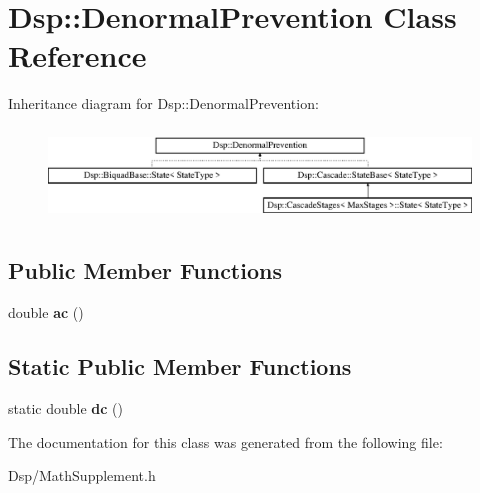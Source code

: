 \hypertarget{classDsp_1_1DenormalPrevention}{\section{Dsp\-:\-:Denormal\-Prevention Class Reference}
\label{classDsp_1_1DenormalPrevention}
}
Inheritance diagram for Dsp\-:\-:Denormal\-Prevention\-:\begin{figure}[H]
\begin{center}
\leavevmode
\includegraphics[height=2.500000cm]{classDsp_1_1DenormalPrevention}
\end{center}
\end{figure}
\subsection*{Public Member Functions}
\begin{DoxyCompactItemize}
\item 
\hypertarget{classDsp_1_1DenormalPrevention_ad236342508acfbc68c91deaa3965f402}{double {\bfseries ac} ()}\label{classDsp_1_1DenormalPrevention_ad236342508acfbc68c91deaa3965f402}

\end{DoxyCompactItemize}
\subsection*{Static Public Member Functions}
\begin{DoxyCompactItemize}
\item 
\hypertarget{classDsp_1_1DenormalPrevention_a29e349d055cf302bfc97a0ecfd2a16dc}{static double {\bfseries dc} ()}\label{classDsp_1_1DenormalPrevention_a29e349d055cf302bfc97a0ecfd2a16dc}

\end{DoxyCompactItemize}


The documentation for this class was generated from the following file\-:\begin{DoxyCompactItemize}
\item 
Dsp/Math\-Supplement.\-h\end{DoxyCompactItemize}
